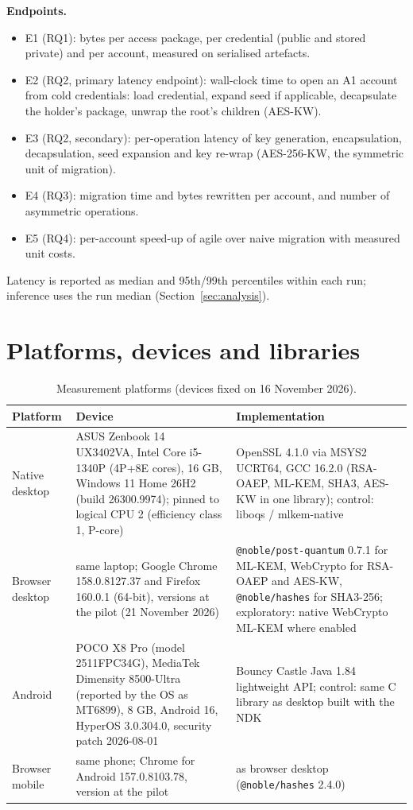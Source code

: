 \documentclass[11pt,a4paper]{article}
\begin{document}
\textbf{Endpoints.}
\begin{itemize}
\item E1 (RQ1): bytes per access package, per credential (public and stored private) and per account, measured on serialised artefacts.
\item E2 (RQ2, primary latency endpoint): wall-clock time to open an A1 account from cold credentials: load credential, expand seed if applicable, decapsulate the holder's package, unwrap the root's children (AES-KW).
\item E3 (RQ2, secondary): per-operation latency of key generation, encapsulation, decapsulation, seed expansion and key re-wrap (AES-256-KW, the symmetric unit of migration).
\item E4 (RQ3): migration time and bytes rewritten per account, and number of asymmetric operations.
\item E5 (RQ4): per-account speed-up of agile over naive migration with measured unit costs.
\end{itemize}
Latency is reported as median and 95th/99th percentiles within each run; inference uses the run median (Section~\ref{sec:analysis}).

\section{Platforms, devices and libraries}\label{sec:platforms}
\begin{table}[H]
\centering\small
\caption{Measurement platforms (devices fixed on 16 November 2026).}
\begin{tabularx}{\textwidth}{>{\raggedright\arraybackslash}p{2.3cm} >{\raggedright\arraybackslash}p{5.4cm} L}
\toprule
\textbf{Platform} & \textbf{Device} & \textbf{Implementation}\\
\midrule
Native desktop & ASUS Zenbook 14 UX3402VA, Intel Core i5-1340P (4P+8E cores), 16 GB, Windows 11 Home 26H2 (build 26300.9974); pinned to logical CPU 2 (efficiency class 1, P-core) & OpenSSL 4.1.0 via MSYS2 UCRT64, GCC 16.2.0 (RSA-OAEP, ML-KEM, SHA3, AES-KW in one library); control: liboqs / mlkem-native\\
Browser desktop & same laptop; Google Chrome 158.0.8127.37 and Firefox 160.0.1 (64-bit), versions at the pilot (21 November 2026) & \texttt{@noble/\allowbreak{}post-quantum} 0.7.1 for ML-KEM, WebCrypto for RSA-OAEP and AES-KW, \texttt{@noble/\allowbreak{}hashes} for SHA3-256; exploratory: native WebCrypto ML-KEM where enabled\\
Android & POCO X8 Pro (model 2511FPC34G), MediaTek Dimensity 8500-Ultra (reported by the OS as MT6899), 8 GB, Android 16, HyperOS 3.0.304.0, security patch 2026-08-01 & Bouncy Castle Java 1.84 lightweight API; control: same C library as desktop built with the NDK\\
Browser mobile & same phone; Chrome for Android 157.0.8103.78, version at the pilot & as browser desktop (\texttt{@noble/\allowbreak{}hashes} 2.4.0)\\
\bottomrule
\end{tabularx}
\end{table}
\end{document}
